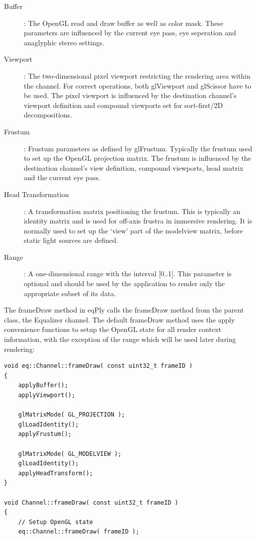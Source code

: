 \documentclass[10pt,a4]{scrartcl}
\begin{document}
\begin{description}
\item[Buffer]: The OpenGL read and draw buffer as well as color mask.
  These parameters are influenced by the current eye pass, eye
  seperation and anaglyphic stereo settings.
\item[Viewport]: The two-dimensional pixel viewport restricting the
  rendering area within the channel. For correct operations, both
  \textsf{glViewport} and \textsf{glScissor} have to be used. The pixel
  viewport is influenced by the destination channel's viewport
  definition and compound viewports set for sort-first/2D decompositions.
\item[Frustum]: Frustum parameters as defined by
  \textsf{glFrustum}. Typically the frustum used to set up the OpenGL
  projection matrix. The frustum is influenced by the destination
  channel's view definition, compound viewports, head matrix and the
  current eye pass.
\item[Head Transformation]: A transformation matrix positioning the
  frustum. This is typically an identity matrix and is used for off-axis
  frustra in immersive rendering. It is normally used to set up the
  `view' part of the modelview matrix, before static light sources are
  defined.
\item[Range]: A one-dimensional range with the interval [0..1]. This
  parameter is optional and should be used by the application to render
  only the appropriate subset of its data.
\end{description}

The \textsf{frameDraw} method in \textsf{eqPly} calls the
\textsf{frameDraw} method from the parent class, the Equalizer
channel. The default \textsf{frameDraw} method uses the apply
convenience functions to setup the OpenGL state for all render context
information, with the exception of the range which will be used later
during rendering:

{\footnotesize\begin{lstlisting}
void eq::Channel::frameDraw( const uint32_t frameID )
{
    applyBuffer();
    applyViewport();
    
    glMatrixMode( GL_PROJECTION );
    glLoadIdentity();
    applyFrustum();

    glMatrixMode( GL_MODELVIEW );
    glLoadIdentity();
    applyHeadTransform();
}

void Channel::frameDraw( const uint32_t frameID )
{
    // Setup OpenGL state
    eq::Channel::frameDraw( frameID );
\end{lstlisting}}
\end{document}
